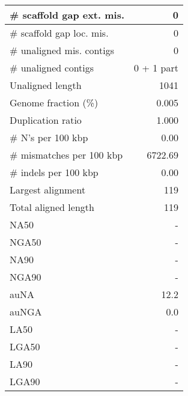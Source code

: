 \documentclass[12pt,a4paper]{article}
\begin{document}
\begin{table}[ht]
\begin{center}
\begin{tabular}{|l*{1}{|r}|}
\# scaffold gap ext. mis. & 0 \\ \hline
\# scaffold gap loc. mis. & 0 \\ \hline
\# unaligned mis. contigs & 0 \\ \hline
\# unaligned contigs & 0 + 1 part \\ \hline
Unaligned length & 1041 \\ \hline
Genome fraction (\%) & 0.005 \\ \hline
Duplication ratio & 1.000 \\ \hline
\# N's per 100 kbp & 0.00 \\ \hline
\# mismatches per 100 kbp & 6722.69 \\ \hline
\# indels per 100 kbp & 0.00 \\ \hline
Largest alignment & 119 \\ \hline
Total aligned length & 119 \\ \hline
NA50 & - \\ \hline
NGA50 & - \\ \hline
NA90 & - \\ \hline
NGA90 & - \\ \hline
auNA & 12.2 \\ \hline
auNGA & 0.0 \\ \hline
LA50 & - \\ \hline
LGA50 & - \\ \hline
LA90 & - \\ \hline
LGA90 & - \\ \hline
\end{tabular}
\end{center}
\end{table}
\end{document}
